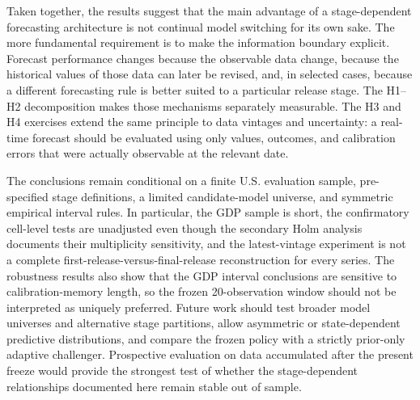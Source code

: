 Taken together, the results suggest that the main advantage of a
stage-dependent forecasting architecture is not continual model switching for
its own sake.  The more fundamental requirement is to make the information
boundary explicit.  Forecast performance changes because the observable data
change, because the historical values of those data can later be revised, and,
in selected cases, because a different forecasting rule is better suited to a
particular release stage.  The H1--H2 decomposition makes those mechanisms
separately measurable.  The H3 and H4 exercises extend the same principle to
data vintages and uncertainty: a real-time forecast should be evaluated using
only values, outcomes, and calibration errors that were actually observable at
the relevant date.

The conclusions remain conditional on a finite U.S. evaluation sample,
pre-specified stage definitions, a limited candidate-model universe, and
symmetric empirical interval rules.  In particular, the GDP sample is short,
the confirmatory cell-level tests are unadjusted even though the secondary
Holm analysis documents their multiplicity sensitivity, and the latest-vintage
experiment is not a complete first-release-versus-final-release reconstruction
for every series. The robustness results also show that the GDP interval
conclusions are sensitive to calibration-memory length, so the frozen
20-observation window should not be interpreted as uniquely preferred.  Future
work should test broader model universes and alternative stage partitions,
allow asymmetric or state-dependent predictive distributions, and compare the
frozen policy with a strictly prior-only adaptive challenger.  Prospective evaluation on data accumulated after the present
freeze would provide the strongest test of whether the stage-dependent
relationships documented here remain stable out of sample.
